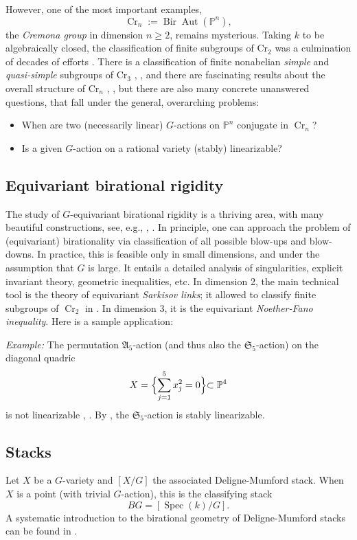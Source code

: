 \documentclass[12pt,reqno]{amsart}
\theoremstyle{plain}
\theoremstyle{remark}
\theoremstyle{definition}
\numberwithin{equation}{section}
\newcommand{\bP}{{\mathbb P}}
\newcommand{\fA}{{\mathfrak A}}
\newcommand{\fS}{{\mathfrak S}}
\DeclareMathOperator{\Spec}{Spec}
\DeclareMathOperator{\Aut}{Aut}
\DeclareMathOperator{\Bir}{Bir}
\DeclareMathOperator{\Cr}{Cr}
\begin{document}
However, one of the most important examples,
$$
\Cr_n:=\Bir\Aut(\bP^n), 
$$
the {\em Cremona group} in dimension $n\ge 2$, remains mysterious.
Taking $k$ to be algebraically closed,
the classification of finite subgroups of 
$\mathrm{Cr}_2$ was a culmination of decades of efforts \cite{DI}. 
There is a classification of finite  nonabelian {\em simple} and {\em quasi-simple} subgroups of $\mathrm{Cr}_3$ \cite{ProSimple}, \cite{blancfinite}, and there are fascinating results about the overall structure of $\mathrm{Cr}_n$ \cite{pro-jordan}, \cite{blanc-quo}, but there are also many concrete unanswered questions, that fall under the general, overarching problems:
\begin{itemize}
\item When are two (necessarily linear) $G$-actions on $\bP^n$ conjugate in $\Cr_n$?
\item Is a given $G$-action on a rational variety (stably) linearizable?
\end{itemize}


\subsection{Equivariant birational rigidity}

The study of $G$-equivariant birational rigidity is a thriving area, with many beautiful constructions, see, e.g., \cite{Pro-ECM}, \cite{CS}.  
In principle, one can approach the problem of (equivariant) birationality via classification of all possible blow-ups and blow-downs. In practice, this is feasible only in small dimensions, and under the assumption that $G$ is large. 
It entails a detailed analysis of singularities, explicit invariant theory, geometric inequalities, etc. 
In dimension 2, the main technical tool is the theory of equivariant {\em Sarkisov links}; it allowed to classify finite subgroups of $\Cr_2$ in \cite{DI}. 
In dimension 3, it is the equivariant {\em Noether-Fano inequality}. Here is a sample application:   

\medskip
\noindent
{\em Example:}
The permutation $\fA_5$-action (and thus also the $\fS_5$-action) on the diagonal quadric 
$$
X=\Bigl\{ \sum_{j=1}^5 x_j^2=0 \Bigl\} \subset \bP^4
$$ 
is not linearizable \cite{CSZ}, \cite{PZ}. By \cite[Thm. 4.1]{CTZ-3}, the $\fS_5$-action is stably linearizable. 


\subsection{Stacks}
\label{sect:stacks}
Let $X$ be a $G$-variety and $[X/G]$ the associated Deligne-Mumford stack.
When $X$ is a point (with trivial $G$-action), this is the classifying stack 
$$
BG=[\Spec(k)/G].
$$
A systematic introduction to the birational geometry of Deligne-Mumford stacks can be found in \cite{KT-stacks}.
\end{document}

